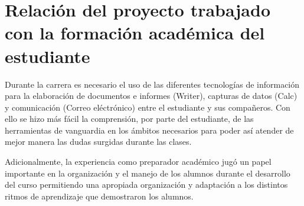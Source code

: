 \chapter{Relación del proyecto trabajado con la formación académica del estudiante}

    Durante la carrera es necesario el uso de las diferentes tecnologías de información para la elaboración de documentos e informes (Writer), capturas de datos (Calc) y comunicación (Correo eléctrónico) entre el estudiante y sus compañeros. Con ello se hizo más fácil la comprensión, por parte del estudiante, de las herramientas de vanguardia en los ámbitos necesarios para poder así atender de mejor manera las dudas surgidas durante las clases.
    
    Adicionalmente, la experiencia como preparador académico jugó un papel importante en la organización y el manejo de los alumnos durante el desarrollo del curso permitiendo una apropiada organización y adaptación a los distintos ritmos de aprendizaje que demostraron los alumnos.
    

        
        
        
        
        
    
    
 
\pagebreak